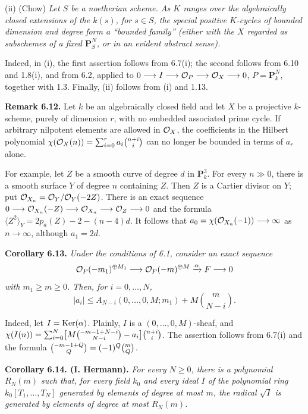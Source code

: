 (ii) (Chow) \emph{Let $S$ be a noetherian scheme. As $K$ ranges over
the algebraically closed extensions of the $k(s)$, for $s\in S$, the
special positive $K$-cycles of bounded dimension and degree form a
``bounded family'' (either with the $X$ regarded as subschemes of a fixed
$\mathbf P^N_S$, or in an evident abstract sense).}

Indeed, in (i), the first assertion follows from 6.7(i); the second
follows from 6.10 and 1.8(i), and from 6.2, applied to
$0\longrightarrow I\longrightarrow\mathcal O_P\longrightarrow\mathcal O_X\longrightarrow0$,
$P=\mathbf P^N_k$, together with 1.3. Finally, (ii) follows from (i) and
1.13.

\textbf{Remark 6.12.} Let $k$ be an algebraically closed field and let
$X$ be a projective $k$-scheme, purely of dimension $r$, with no embedded
associated prime cycle. If arbitrary nilpotent elements are allowed in
$\mathcal O_X$, the coefficients in the Hilbert polynomial
$\chi(\mathcal O_X(n))=\sum_{i=0}^{r}a_i\binom{n+i}{i}$ can no longer be bounded
in terms of $a_r$ alone.

For example, let $Z$ be a smooth curve of degree $d$ in $\mathbf P^3_k$.
For every $n\gg0$, there is a smooth surface $Y$ of degree $n$ containing
$Z$. Then $Z$ is a Cartier divisor on $Y$; put
$\mathcal O_{X_n}=\mathcal O_Y/\mathcal O_Y(-2Z)$. There is an exact sequence
$0\longrightarrow\mathcal O_{X_n}(-Z)\longrightarrow
\mathcal O_{X_n}\longrightarrow\mathcal O_Z\longrightarrow0$ and the formula
$\langle Z^2\rangle_Y=2p_a(Z)-2-(n-4)d$. It follows that
$a_0=\chi(\mathcal O_{X_n}(-1))\longrightarrow\infty$ as $n\longrightarrow
\infty$, although $a_1=2d$.

\textbf{Corollary 6.13.} \emph{Under the conditions of 6.1, consider an exact sequence
\[
  \mathcal O_P(-m_1)^{\oplus M_1}\longrightarrow
  \mathcal O_P(-m)^{\oplus M}\xrightarrow{\alpha}F\longrightarrow0
\]
with $m_1\geq m\geq0$. Then, for $i=0,\ldots,N$,
\[
  |a_i|\leq A_{N-i}(0,\ldots,0,M;m_1)
  +M\binom{m}{N-i}.
\]}

Indeed, let $I=\operatorname{Ker}(\alpha)$. Plainly, $I$ is a
$(0,\ldots,0,M)$-sheaf, and
$\chi(I(n))=\allowbreak\sum_{i=0}^{N}
\bigl[M\tbinom{-m-1+N-i}{N-i}-a_i\bigr]\allowbreak\tbinom{n+i}{i}$.
The assertion follows from 6.7(i) and the formula
$\tbinom{-m-1+Q}{Q}=(-1)^Q\tbinom{m}{Q}$.

\textbf{Corollary 6.14. (I. Hermann).} \emph{For every $N\geq0$, there
is a polynomial $R_N(m)$ such that, for every field $k_0$ and every ideal
$I$ of the polynomial ring $k_0[T_1,\ldots,T_N]$ generated by elements
of degree at most $m$, the radical $\sqrt I$ is generated by elements of
degree at most $R_N(m)$.}

